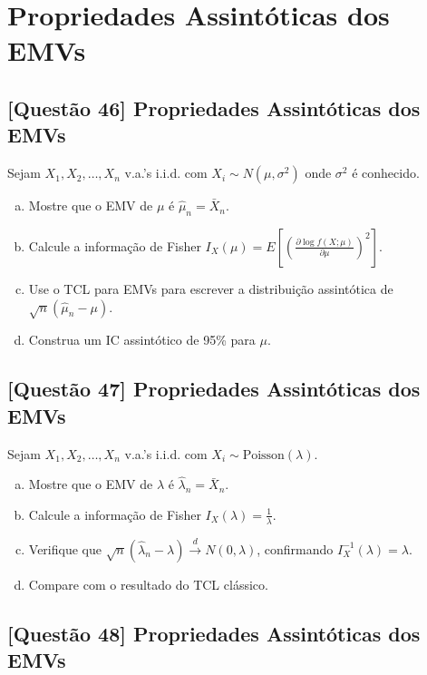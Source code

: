 \documentclass[12pt,a4paper]{article}
\begin{document}
\section{Propriedades Assintóticas dos EMVs}

\subsection*{[Questão 46] Propriedades Assintóticas dos EMVs}

Sejam $X_1, X_2, \ldots, X_n$ v.a.'s i.i.d. com $X_i \sim N(\mu, \sigma^2)$ onde $\sigma^2$ é conhecido.

\begin{enumerate}[(a)]
    \item Mostre que o EMV de $\mu$ é $\hat{\mu}_n = \bar{X}_n$.
    \item Calcule a informação de Fisher $I_X(\mu) = E\left[\left(\frac{\partial \log f(X;\mu)}{\partial \mu}\right)^2\right]$.
    \item Use o TCL para EMVs para escrever a distribuição assintótica de $\sqrt{n}(\hat{\mu}_n - \mu)$.
    \item Construa um IC assintótico de 95\% para $\mu$.
\end{enumerate}

\subsection*{[Questão 47] Propriedades Assintóticas dos EMVs}

Sejam $X_1, X_2, \ldots, X_n$ v.a.'s i.i.d. com $X_i \sim \text{Poisson}(\lambda)$.

\begin{enumerate}[(a)]
    \item Mostre que o EMV de $\lambda$ é $\hat{\lambda}_n = \bar{X}_n$.
    \item Calcule a informação de Fisher $I_X(\lambda) = \frac{1}{\lambda}$.
    \item Verifique que $\sqrt{n}(\hat{\lambda}_n - \lambda) \xrightarrow{d} N(0, \lambda)$, confirmando $I_X^{-1}(\lambda) = \lambda$.
    \item Compare com o resultado do TCL clássico.
\end{enumerate}

\subsection*{[Questão 48] Propriedades Assintóticas dos EMVs}
\end{document}
